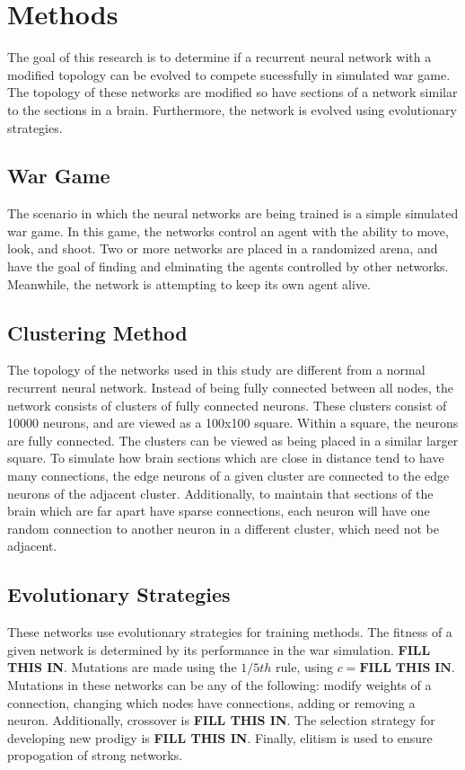 \documentclass[journal]{IEEEtran}
\begin{document}
\section{Methods}
    The goal of this research is to determine if a recurrent neural network with a modified topology can be evolved to 
    compete sucessfully in simulated war game. The topology of these networks are modified so have sections of a network similar
    to the sections in a brain. Furthermore, the network is evolved using evolutionary strategies. 

    \subsection{War Game}
    The scenario in which the neural networks are being trained is a simple simulated war game. In this game, the networks control an agent
    with the ability to move, look, and shoot. Two or more networks are placed in a randomized arena, and have the goal of
    finding and elminating the agents controlled by other networks. Meanwhile, the network is attempting to keep its own agent alive.

    \subsection{Clustering Method}
    The topology of the networks used in this study are different from a normal recurrent neural network. Instead of being fully
    connected between all nodes, the network consists of clusters of fully connected neurons. These clusters consist of 10000 
    neurons, and are viewed as a 100x100 square. Within a square, the neurons are fully connected. The clusters can be viewed as 
    being placed in a similar larger square. To simulate how brain sections which are close in distance tend to have many connections,
    the edge neurons of a given cluster are connected to the edge neurons of the adjacent cluster. Additionally, to maintain 
    that sections of the brain which are far apart have sparse connections, each neuron will have one random connection to 
    another neuron in a different cluster, which need not be adjacent. 

    \subsection{Evolutionary Strategies}
    These networks use evolutionary strategies for training methods. The fitness of a given network is determined by its performance
    in the war simulation. \textbf{FILL THIS IN}. Mutations are made using the $1/5th$ rule, using $c=\textbf{FILL THIS IN}$.
    Mutations in these networks can be any of the following: modify weights of a connection, changing which nodes have connections,
    adding or removing a neuron. Additionally, crossover is \textbf{FILL THIS IN}. The selection strategy for developing new 
    prodigy is \textbf{FILL THIS IN}. Finally, elitism is used to ensure propogation of strong networks. 
\end{document}
